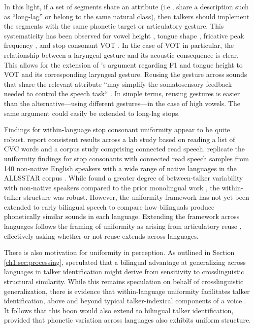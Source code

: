 In this light, if a set of segments share an attribute (i.e., share a description such as ``long-lag'' or belong to the same natural class), then talkers should implement the segments with the same phonetic target or articulatory gesture. This systematicity has been observed for vowel height \citep{menard_2008_invariance}, tongue shape \citep{faytak_2018_uniformity}, fricative peak frequency \citep{chodroff_inpress_sibilant}, and stop consonant VOT \citep{chodroff_2017_structure}. In the case of VOT in particular, the relationship between a laryngeal gesture and its acoustic consequence is clear. This allows for the extension of \citeauthor{menard_2008_invariance}'s \citeyearpar{menard_2008_invariance} argument regarding F1 and tongue height to VOT and its corresponding laryngeal gesture. Reusing the gesture across sounds that share the relevant attribute ``may simplify the somatosensory feedback needed to control the speech task`` \citep[][p. 26]{menard_2008_invariance}. In simple terms, reusing gestures is easier than the alternative---using different gestures---in the case of high vowels. The same argument could easily be extended to long-lag stops.

Findings for within-language stop consonant uniformity appear to be quite robust. \citet{chodroff_2017_structure} report consistent results across a lab study based on reading a list of CVC words and a corpus study comprising connected read speech. \citet{chodroff_2019_l2} replicate the uniformity findings for stop consonants with connected read speech samples from 140 non-native English speakers with a wide range of native languages in the ALLSSTAR corpus \citep{bradlow_2011_allsstar}. While \citet{chodroff_2019_l2} found a greater degree of between-talker variability with non-native speakers compared to the prior monolingual work \citep{chodroff_2017_structure}, the within-talker structure was robust. However, the uniformity framework has not yet been extended to early bilingual speech to compare how bilinguals produce phonetically similar sounds in each language. Extending the framework across languages follows the framing of uniformity as arising from articulatory reuse \citep{faytak_2018_uniformity}, effectively asking whether or not reuse extends across languages.

There is also motivation for uniformity in perception. As outlined in Section \ref{ch1:sec:processing}, \citet{orena_2019_identifying} speculated that a bilingual advantage at generalizing across languages in talker identification might derive from sensitivity to crosslinguistic structural similarity. While this remains speculation on behalf of crosslinguistic generalization, there is evidence that within-language uniformity facilitates talker identification, above and beyond typical talker-indexical components of a voice \citep{ganugapati_2019_structured}. It follows that this boon would also extend to bilingual talker identification, provided that phonetic variation across languages also exhibits uniform structure. 

